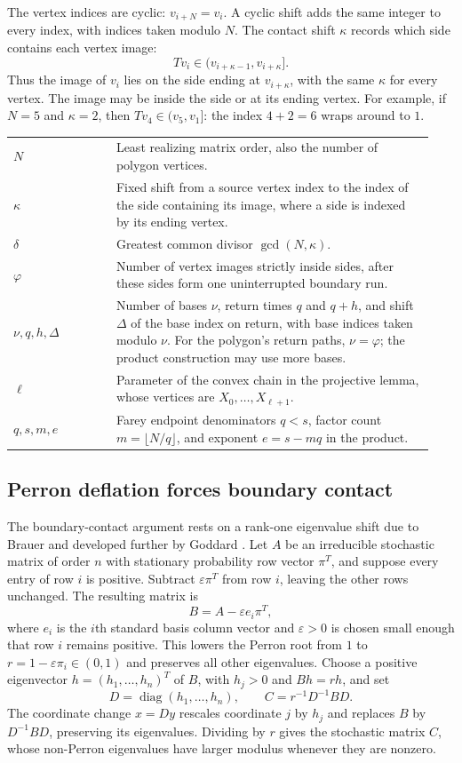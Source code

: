\documentclass[11pt,a4paper]{article}
\theoremstyle{definition}
\theoremstyle{remark}
\numberwithin{equation}{section}
\begin{document}
The vertex indices are cyclic: $v_{i+N}=v_i$. A cyclic shift adds the same integer to every index, with indices taken modulo $N$. The contact shift $\kappa$ records which side contains each vertex image:
\[
 Tv_i\in(v_{i+\kappa-1},v_{i+\kappa}].
\]
Thus the image of $v_i$ lies on the side ending at $v_{i+\kappa}$, with the same $\kappa$ for every vertex. The image may be inside the side or at its ending vertex. For example, if $N=5$ and $\kappa=2$, then $Tv_4\in(v_5,v_1]$: the index $4+2=6$ wraps around to $1$.
\begin{center}
\begin{tabular}{@{}p{0.23\linewidth}p{0.71\linewidth}@{}}
$N$ & Least realizing matrix order, also the number of polygon vertices.\\[3pt]
$\kappa$ & Fixed shift from a source vertex index to the index of the side containing its image, where a side is indexed by its ending vertex.\\[3pt]
$\delta$ & Greatest common divisor $\gcd(N,\kappa)$.\\[3pt]
$\varphi$ & Number of vertex images strictly inside sides, after these sides form one uninterrupted boundary run.\\[3pt]
$\nu,q,h,\Delta$ & Number of bases $\nu$, return times $q$ and $q+h$, and shift $\Delta$ of the base index on return, with base indices taken modulo $\nu$. For the polygon's return paths, $\nu=\varphi$; the product construction may use more bases.\\[3pt]
$\ell$ & Parameter of the convex chain in the projective lemma, whose vertices are $X_0,\ldots,X_{\ell+1}$.\\[3pt]
$q,s,m,e$ & Farey endpoint denominators $q<s$, factor count $m=\lfloor N/q\rfloor$, and exponent $e=s-mq$ in the product.
\end{tabular}
\end{center}

\subsection{Perron deflation forces boundary contact}
The boundary-contact argument rests on a rank-one eigenvalue shift due to Brauer \cite{Brauer} and developed further by Goddard \cite{Goddard}. Let $A$ be an irreducible stochastic matrix of order $n$ with stationary probability row vector $\pi^T$, and suppose every entry of row $i$ is positive. Subtract $\varepsilon\pi^T$ from row $i$, leaving the other rows unchanged. The resulting matrix is
\[
 B=A-\varepsilon e_i\pi^T,
\]
where $e_i$ is the $i$th standard basis column vector and $\varepsilon>0$ is chosen small enough that row $i$ remains positive. This lowers the Perron root from $1$ to $r=1-\varepsilon\pi_i\in(0,1)$ and preserves all other eigenvalues. Choose a positive eigenvector $h=(h_1,\ldots,h_n)^T$ of $B$, with $h_j>0$ and $Bh=rh$, and set
\[
 D=\operatorname{diag}(h_1,\ldots,h_n),\qquad
 C=r^{-1}D^{-1}BD.
\]
The coordinate change $x=Dy$ rescales coordinate $j$ by $h_j$ and replaces $B$ by $D^{-1}BD$, preserving its eigenvalues. Dividing by $r$ gives the stochastic matrix $C$, whose non-Perron eigenvalues have larger modulus whenever they are nonzero.
\end{document}
